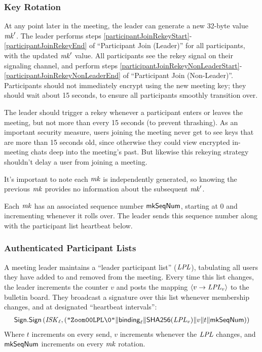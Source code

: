 \subsubsection{Key Rotation}

At any point later in the meeting, the leader can generate a new 32-byte value $\mathit{mk}'$. The leader performs steps \ref{participantJoinRekeyStart}-\ref{participantJoinRekeyEnd} of ``Participant Join (Leader)'' for all participants, with the updated $\mathit{mk}'$ value. All participants see the rekey signal on their signaling channel, and perform steps \ref{participantJoinRekeyNonLeaderStart}-\ref{participantJoinRekeyNonLeaderEnd} of ``Participant Join (Non-Leader)''.  Participants should not immediately encrypt using the new meeting key; they should wait about 15 seconds, to ensure all participants smoothly transition over.

The leader should trigger a rekey whenever a participant enters or leaves the meeting, but not more than every 15 seconds (to prevent thrashing). As an important security measure, users joining the meeting never get to see keys that are more than 15 seconds old, since otherwise they could view encrypted in-meeting chats deep into the meeting's past. But likewise this rekeying strategy shouldn't delay a user from joining a meeting.

It's important to note each $\mathit{mk}$ is independently generated, so knowing the previous $\mathit{mk}$ provides no information about the subsequent $\mathit{mk}'$.

Each $\mathit{mk}$ has an associated sequence number $\mathsf{mkSeqNum}$, starting at 0 and incrementing whenever it rolls over. The leader sends this sequence number along with the participant list heartbeat below.

\subsubsection{Authenticated Participant Lists}

A meeting leader maintains a ``leader participant list'' ($\mathit{LPL}$), tabulating
all users they have added to and removed from the meeting. Every time this list changes, the leader increments the counter $v$ and posts the mapping $\langle v \rightarrow \mathit{LPL}_v \rangle$ to the bulletin board. They broadcast a signature over this list whenever membership changes, and at designated ``heartbeat intervals'':
%
\begin{align*}
{\sf Sign}.\mathsf{Sign} \left(\mathit{ISK}_{\ell}, (\texttt{"Zoom00LPL\textbackslash0"} \| {\sf binding}_{\ell} \| \mathsf{SHA256}(\mathit{LPL}_v) \| v \| t \| \mathsf{mkSeqNum} ) \right)
\end{align*}
%
Where $t$ increments on every send, $v$ increments whenever the $\mathit{LPL}$ changes, and $\mathsf{mkSeqNum}$ increments on every $\mathit{mk}$ rotation.

